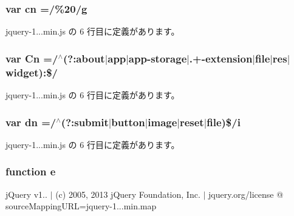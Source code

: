 \hypertarget{jquery-1_810_82_8min_8js_a43c2bda2537661fb64e62fdfdcea1560}{}
\subsubsection[{cn}]{\setlength{\rightskip}{0pt plus 5cm}var cn =/\%20/g}\label{jquery-1_810_82_8min_8js_a43c2bda2537661fb64e62fdfdcea1560}


 jquery-\/1...\+min.\+js の 6 行目に定義があります。

\hypertarget{jquery-1_810_82_8min_8js_ab832fcb3f80f807f0b65d1e3b4904de8}{}
\subsubsection[{Cn}]{\setlength{\rightskip}{0pt plus 5cm}var Cn =/$^\wedge$(?\+:about$\vert$app$\vert$app-\/storage$\vert$.+-\/extension$\vert$file$\vert$res$\vert$widget)\+:\$/}\label{jquery-1_810_82_8min_8js_ab832fcb3f80f807f0b65d1e3b4904de8}


 jquery-\/1...\+min.\+js の 6 行目に定義があります。

\hypertarget{jquery-1_810_82_8min_8js_ab5e3f3e2b2507b73e2d8092caa5c8650}{}
\subsubsection[{dn}]{\setlength{\rightskip}{0pt plus 5cm}var dn =/$^\wedge$(?\+:submit$\vert${\bf button}$\vert$image$\vert$reset$\vert$file)\$/i}\label{jquery-1_810_82_8min_8js_ab5e3f3e2b2507b73e2d8092caa5c8650}


 jquery-\/1...\+min.\+js の 6 行目に定義があります。

\hypertarget{jquery-1_810_82_8min_8js_a2c038346d47955cbe2cb91e338edd7e1}{}
\subsubsection[{e}]{\setlength{\rightskip}{0pt plus 5cm}function e}\label{jquery-1_810_82_8min_8js_a2c038346d47955cbe2cb91e338edd7e1}
j\+Query v1.. $\vert$ (c) 2005, 2013 j\+Query Foundation, Inc. $\vert$ jquery.\+org/license @ source\+Mapping\+U\+R\+L=jquery-\/1...\+min.\+map 

